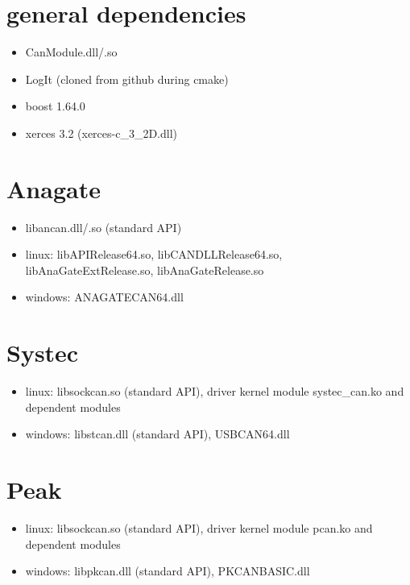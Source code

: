\documentclass[letterpaper,10pt,english]{sphinxmanual}
\begin{document}
\section{general dependencies}
\label{\detokenize{running:general-dependencies}}\begin{itemize}
\item {} 
CanModule.dll/.so

\item {} 
LogIt (cloned from github during cmake)

\item {} 
boost 1.64.0

\item {} 
xerces 3.2 (xerces-c\_3\_2D.dll)

\end{itemize}


\section{Anagate}
\label{\detokenize{running:anagate}}\begin{itemize}
\item {} 
libancan.dll/.so  (standard API)

\item {} 
linux: libAPIRelease64.so, libCANDLLRelease64.so, libAnaGateExtRelease.so, libAnaGateRelease.so

\item {} 
windows: ANAGATECAN64.dll

\end{itemize}


\section{Systec}
\label{\detokenize{running:systec}}\begin{itemize}
\item {} 
linux: libsockcan.so (standard API), driver kernel module systec\_can.ko and dependent modules

\item {} 
windows: libstcan.dll (standard API), USBCAN64.dll

\end{itemize}


\section{Peak}
\label{\detokenize{running:peak}}\begin{itemize}
\item {} 
linux: libsockcan.so (standard API), driver kernel module pcan.ko and dependent modules

\item {} 
windows: libpkcan.dll (standard API), PKCANBASIC.dll

\end{itemize}
\end{document}
